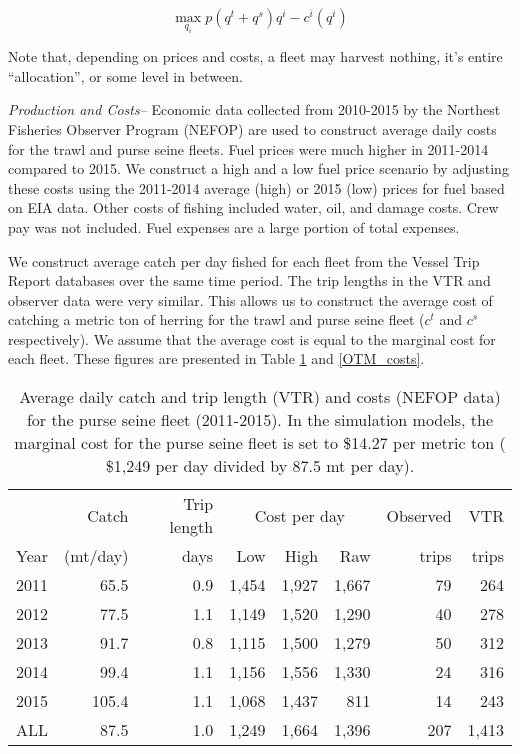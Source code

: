 \documentclass[]{article}
\begin{document}
\begin{equation}
\label{optimization_problem}
\max_{q_i} p(q^t+q^s)q^i - c^i(q^i)
\end{equation}

Note that, depending on prices and costs, a fleet may harvest nothing,
it's entire ``allocation'', or some level in between.

\emph{Production and Costs--} Economic data collected from 2010-2015 by
the Northest Fisheries Observer Program (NEFOP) are used to construct
average daily costs for the trawl and purse seine fleets. Fuel prices
were much higher in 2011-2014 compared to 2015. We construct a high and
a low fuel price scenario by adjusting these costs using the 2011-2014
average (high) or 2015 (low) prices for fuel based on EIA data. Other
costs of fishing included water, oil, and damage costs. Crew pay was not
included. Fuel expenses are a large portion of total expenses.

We construct average catch per day fished for each fleet from the Vessel
Trip Report databases over the same time period. The trip lengths in the
VTR and observer data were very similar. This allows us to construct the
average cost of catching a metric ton of herring for the trawl and purse
seine fleet (\(c^t\) and \(c^s\) respectively). We assume that the
average cost is equal to the marginal cost for each fleet. These figures
are presented in Table \ref{PUR_costs} and \ref{OTM_costs}.

\begin{table}[htpb]
\begin{centering}
\begin{tabular}{lrrrrrrr}\hline
    &   Catch & Trip length&\multicolumn{3}{c}{Cost per day}    &   Observed    &   VTR \\
Year    &    (mt/day) &days &   Low &   High    &   Raw &    trips  &    trips  \\\hline
2011    &   65.5& 0.9   &   1,454   &   1,927   &   1,667   &   79  &   264 \\
2012    &   77.5& 1.1   &   1,149   &   1,520   &   1,290   &   40  &   278 \\
2013    &   91.7& 0.8   &   1,115   &   1,500   &   1,279   &   50  &   312 \\
2014    &   99.4& 1.1   &   1,156   &   1,556   &   1,330   &   24  &   316 \\
2015    &   105.4 & 1.1 &   1,068   &   1,437   &   811 &   14  &   243 \\
ALL &   87.5& 1.0&  1,249   &   1,664   &   1,396   &   207 &   1,413   \\\hline
\end{tabular}
\caption{Average daily catch and trip length (VTR) and costs (NEFOP data) for the purse seine fleet (2011-2015).  \label{PUR_costs}  In the simulation models, the marginal cost for the purse seine fleet is set to \$14.27 per metric ton ( \$1,249 per day divided by 87.5 mt per day).  }
\end{centering}
\end{table}
\end{document}
